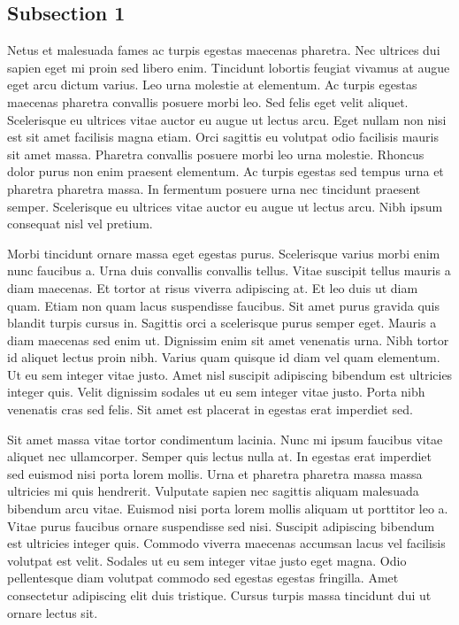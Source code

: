 \subsection{Subsection 1}
Netus et malesuada fames ac turpis egestas maecenas pharetra. Nec ultrices dui sapien eget mi proin sed libero enim. Tincidunt lobortis feugiat vivamus at augue eget arcu dictum varius. Leo urna molestie at elementum. Ac turpis egestas maecenas pharetra convallis posuere morbi leo. Sed felis eget velit aliquet. Scelerisque eu ultrices vitae auctor eu augue ut lectus arcu. Eget nullam non nisi est sit amet facilisis magna etiam. Orci sagittis eu volutpat odio facilisis mauris sit amet massa. Pharetra convallis posuere morbi leo urna molestie. Rhoncus dolor purus non enim praesent elementum. Ac turpis egestas sed tempus urna et pharetra pharetra massa. In fermentum posuere urna nec tincidunt praesent semper. Scelerisque eu ultrices vitae auctor eu augue ut lectus arcu. Nibh ipsum consequat nisl vel pretium.

Morbi tincidunt ornare massa eget egestas purus. Scelerisque varius morbi enim nunc faucibus a. Urna duis convallis convallis tellus. Vitae suscipit tellus mauris a diam maecenas. Et tortor at risus viverra adipiscing at. Et leo duis ut diam quam. Etiam non quam lacus suspendisse faucibus. Sit amet purus gravida quis blandit turpis cursus in. Sagittis orci a scelerisque purus semper eget. Mauris a diam maecenas sed enim ut. Dignissim enim sit amet venenatis urna. Nibh tortor id aliquet lectus proin nibh. Varius quam quisque id diam vel quam elementum. Ut eu sem integer vitae justo. Amet nisl suscipit adipiscing bibendum est ultricies integer quis. Velit dignissim sodales ut eu sem integer vitae justo. Porta nibh venenatis cras sed felis. Sit amet est placerat in egestas erat imperdiet sed.

Sit amet massa vitae tortor condimentum lacinia. Nunc mi ipsum faucibus vitae aliquet nec ullamcorper. Semper quis lectus nulla at. In egestas erat imperdiet sed euismod nisi porta lorem mollis. Urna et pharetra pharetra massa massa ultricies mi quis hendrerit. Vulputate sapien nec sagittis aliquam malesuada bibendum arcu vitae. Euismod nisi porta lorem mollis aliquam ut porttitor leo a. Vitae purus faucibus ornare suspendisse sed nisi. Suscipit adipiscing bibendum est ultricies integer quis. Commodo viverra maecenas accumsan lacus vel facilisis volutpat est velit. Sodales ut eu sem integer vitae justo eget magna. Odio pellentesque diam volutpat commodo sed egestas egestas fringilla. Amet consectetur adipiscing elit duis tristique. Cursus turpis massa tincidunt dui ut ornare lectus sit.
